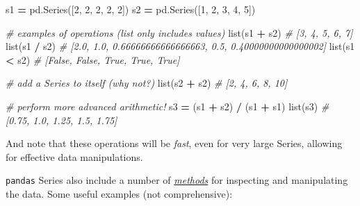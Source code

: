 \documentclass[]{book}
\newenvironment{Shaded}{\begin{snugshade}}{\end{snugshade}}
\newcommand{\DecValTok}[1]{\textcolor[rgb]{0.00,0.00,0.81}{#1}}
\newcommand{\CommentTok}[1]{\textcolor[rgb]{0.56,0.35,0.01}{\textit{#1}}}
\newcommand{\OperatorTok}[1]{\textcolor[rgb]{0.81,0.36,0.00}{\textbf{#1}}}
\newcommand{\BuiltInTok}[1]{#1}
\newcommand{\NormalTok}[1]{#1}
\begin{document}
\begin{Shaded}
\begin{Highlighting}[]
\NormalTok{s1 }\OperatorTok{=}\NormalTok{ pd.Series([}\DecValTok{2}\NormalTok{, }\DecValTok{2}\NormalTok{, }\DecValTok{2}\NormalTok{, }\DecValTok{2}\NormalTok{, }\DecValTok{2}\NormalTok{])}
\NormalTok{s2 }\OperatorTok{=}\NormalTok{ pd.Series([}\DecValTok{1}\NormalTok{, }\DecValTok{2}\NormalTok{, }\DecValTok{3}\NormalTok{, }\DecValTok{4}\NormalTok{, }\DecValTok{5}\NormalTok{])}

\CommentTok{# examples of operations (list only includes values)}
\BuiltInTok{list}\NormalTok{(s1 }\OperatorTok{+}\NormalTok{ s2)  }\CommentTok{# [3, 4, 5, 6, 7]}
\BuiltInTok{list}\NormalTok{(s1 }\OperatorTok{/}\NormalTok{ s2)  }\CommentTok{# [2.0, 1.0, 0.66666666666666663, 0.5, 0.40000000000000002]}
\BuiltInTok{list}\NormalTok{(s1 }\OperatorTok{<}\NormalTok{ s2)  }\CommentTok{# [False, False, True, True, True]}

\CommentTok{# add a Series to itself (why not?)}
\BuiltInTok{list}\NormalTok{(s2 }\OperatorTok{+}\NormalTok{ s2)  }\CommentTok{# [2, 4, 6, 8, 10]}

\CommentTok{# perform more advanced arithmetic!}
\NormalTok{s3 }\OperatorTok{=}\NormalTok{ (s1 }\OperatorTok{+}\NormalTok{ s2) }\OperatorTok{/}\NormalTok{ (s1 }\OperatorTok{+}\NormalTok{ s1)}
\BuiltInTok{list}\NormalTok{(s3)  }\CommentTok{# [0.75, 1.0, 1.25, 1.5, 1.75]}
\end{Highlighting}
\end{Shaded}

And note that these operations will be \emph{fast}, even for very large
Series, allowing for effective data manipulations.

\texttt{pandas} Series also include a number of
\href{http://pandas.pydata.org/pandas-docs/stable/generated/pandas.Series.html}{\emph{methods}}
for inspecting and manipulating the data. Some useful examples (not
comprehensive):
\end{document}
